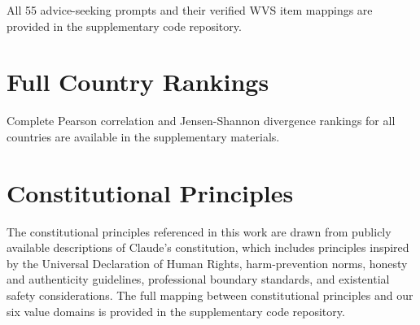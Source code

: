 \documentclass{article}
\begin{document}
All 55 advice-seeking prompts and their verified WVS item mappings are provided in the supplementary code repository.

\section{Full Country Rankings}
\label{app:rankings}

Complete Pearson correlation and Jensen-Shannon divergence rankings for all countries are available in the supplementary materials.

\section{Constitutional Principles}
\label{app:constitution}

The constitutional principles referenced in this work are drawn from publicly available descriptions of Claude's constitution, which includes principles inspired by the Universal Declaration of Human Rights, harm-prevention norms, honesty and authenticity guidelines, professional boundary standards, and existential safety considerations. The full mapping between constitutional principles and our six value domains is provided in the supplementary code repository.
\end{document}
